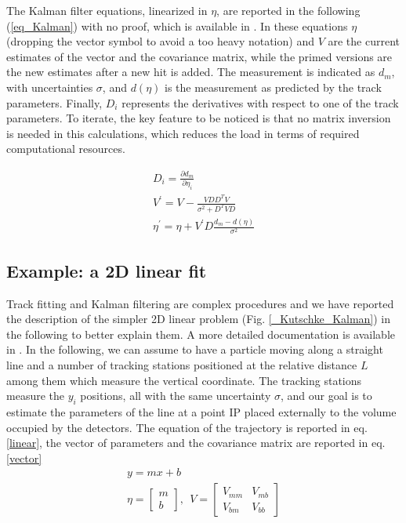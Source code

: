 \documentclass[12pt,a4paper,openright, oneside, titlepage]{book} %
\begin{document}
\noindent
The Kalman filter equations, linearized  in $\eta$, are reported in the following (\ref{eq_Kalman}) with no proof, which is available in \cite{KutschkePaper}. 
In these equations $\eta$ (dropping the vector symbol to avoid a too heavy notation) and $V$ are the current estimates of the vector and the covariance matrix, while the primed versions are the new estimates after a new hit is added. 
The measurement is indicated as $d_m$, with uncertainties $\sigma$, 
and $d(\eta)$ is the measurement as predicted by the track parameters. 
Finally, $D_i$ represents the derivatives with respect to one of the track parameters. 
To iterate, the key feature to be noticed is that no matrix inversion is needed in this calculations,
which reduces the load in terms of required computational resources.

\begin{equation}
\begin{gathered}
D_i = \frac{\partial d_m}{\partial \eta_i} \\
V^\prime = V - \frac{VDD^TV}{\sigma^2+D^TVD}\\
\eta^\prime = \eta + V^\prime D \frac{d_m-d(\eta)}{\sigma^2}
\end{gathered} 
\label{eq_Kalman}
\end{equation}

\subsection{Example: a 2D linear fit}
\label{2Dfit}
Track fitting and Kalman filtering are complex procedures 
and we have reported the description of the simpler 2D linear problem (Fig. \ref{_Kutschke_Kalman})
in the following to better explain them. A more detailed documentation is available in 
 \cite{Kutschke} \cite{KutschkePaper}. 
In the following, we can assume to have a particle moving along a straight line 
and a number of tracking stations positioned at the relative
distance $L$ among them which measure the vertical coordinate.
The tracking stations measure the $y_i$ positions, 
all with the same uncertainty $\sigma$, 
and our goal is to estimate the parameters of the line at a point IP
placed externally to the volume occupied by the detectors.
The equation of the trajectory is reported in eq. \ref{linear}, 
the vector of parameters and the covariance matrix are reported in eq. \ref{vector}
\begin{gather}
y = mx +b \label{linear}\\
\eta = \begin{bmatrix} m \\  b \end{bmatrix},\ \ V=\begin{bmatrix} V_{mm}& V_{mb} \\ V_{bm}& V_{bb} \end{bmatrix} \label{vector}
\end{gather}  
\end{document}
